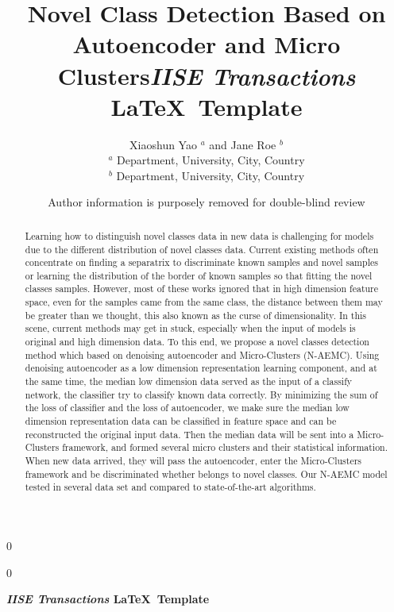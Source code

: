 \documentclass[11pt]{article}
\newcommand{\blind}{0}
\begin{document}
		
		\def\spacingset#1{\renewcommand{\baselinestretch}%
			{#1}\small\normalsize} \spacingset{1}
		
		\blind
		{
			\title{\bf Novel Class Detection Based on Autoencoder and Micro Clusters}
			\author{Xiaoshun Yao $^a$ and Jane Roe $^b$ \\
			$^a$ Department, University, City, Country \\
             $^b$ Department, University, City, Country }
			\date{}
			\maketitle
		} \fi
		
		\blind
		{

            \title{\bf \emph{IISE Transactions} \LaTeX \ Template}
			\author{Author information is purposely removed for double-blind review}
			
\bigskip
			\bigskip
			\bigskip
			\begin{center}
				{\LARGE\bf \emph{IISE Transactions} \LaTeX \ Template}
			\end{center}
			\medskip
		} \fi
		\bigskip
		
	\begin{abstract}
Learning how to distinguish novel classes data in new data is challenging for models due to the different distribution of novel classes data. Current existing methods often concentrate on finding a separatrix to discriminate known samples and novel samples or learning the distribution of the border of known samples so that fitting the novel classes samples. However, most of these works ignored that in high dimension feature space, even for the samples came from the same class, the distance between them may be greater than we thought, this also known as the curse of dimensionality. In this scene, current methods may get in stuck, especially when the input of models is original and high dimension data. To this end, we propose a novel classes detection method which based on denoising autoencoder and Micro-Clusters (N-AEMC). Using denoising autoencoder as a low dimension representation learning component, and at the same time, the median low dimension data served as the input of a classify network, the classifier try to classify known data correctly. By minimizing the sum of the loss of classifier and the loss of autoencoder, we make sure the median low dimension representation data can be classified in feature space and can be reconstructed the original input data. Then the median data will be sent into a Micro-Clusters framework, and formed several micro clusters and their statistical information. When new data arrived, they will pass the autoencoder, enter the Micro-Clusters framework and be discriminated whether belongs to novel classes. Our N-AEMC model tested in several data set and compared to state-of-the-art algorithms. 
	\end{abstract}
			
\end{document}
